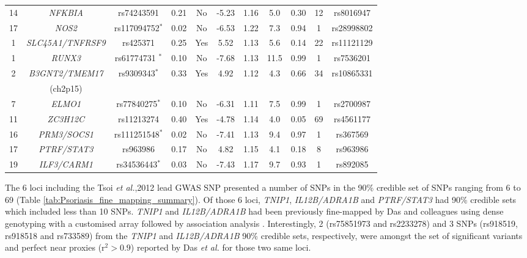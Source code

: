 \begin{landscape}
\begin{center}
\begin{longtable}[ht]{c c c c c c c c c c c}
14	& \textit{NFKBIA}&		 rs74243591            &		0.21 &	No	& -5.23 &1.16 &		5.0  &		0.30 &		12 &		rs8016947 \\
17	& \textit{NOS2}&		   rs117094752$^{\ast}$  &		0.02 &	No  & -6.53 &1.22 &		7.3  &		0.94 &		1  &		rs28998802 \\
1	& \textit{SLC45A1/TNFRSF9}&		rs425371         &		0.25 &  Yes  & 5.52  &1.13 &		5.6  &		0.14 &		22 &		rs11121129 \\
1	& \textit{RUNX3}&		     rs61774731 $^{\ast}$  &		0.10 &	No	& -7.68 &1.13 &		11.5 &		0.99 &		1  &		rs7536201 \\
2	& \textit{B3GNT2/TMEM17}&		rs9309343$^{\ast}$ &		0.33 &	Yes	& 4.92  &1.12 &		4.3  &		0.66 &		34 &		rs10865331 \\
  &  (ch2p15)             &                      &         &         &         &         &       &                \\
7	& \textit{ELMO1}&		     rs77840275$^{\ast}$   &		0.10 &	No	&-6.31  &1.11 &		7.5  &		0.99 &		1  &		rs2700987 \\
11	& \textit{ZC3H12C}&		 rs11213274            &		0.40 &	Yes	& -4.78 &1.14 &		4.0  &		0.05 &		69 &		rs4561177 \\
16	& \textit{PRM3/SOCS1}& rs111251548$^{\ast}$  &		0.02 &	No	& -7.41 &1.13 &		9.4  &		0.97 &		1  &		rs367569 \\
17	& \textit{PTRF/STAT3}& rs963986              &		0.17 &	No	& 4.82  &1.15 &		4.1  &		0.18 &		8  &		rs963986 \\
19	& \textit{ILF3/CARM1}& rs34536443$^{\ast}$   &		0.03 &	No	& -7.43 &1.17 &		9.7  &		0.93 &		1  &		rs892085 \\
\bottomrule
\end{longtable}
\end{center}
\end{landscape}


The 6 loci including the Tsoi \textit{et al.},2012 lead GWAS SNP presented a number of SNPs in the 90\% credible set of SNPs ranging from 6 to 69 (Table \ref{tab:Psoriasis_fine_mapping_summary}). Of those 6 loci, \textit{TNIP1}, \textit{IL12B/ADRA1B} and \textit{PTRF/STAT3} had 90\% credible sets which included less than 10 SNPs. \textit{TNIP1} and \textit{IL12B/ADRA1B} had been previously fine-mapped by Das and colleagues using dense genotyping with a customised array followed by association analysis \parencite{Das2014}. Interestingly, 2 (rs75851973 and rs2233278) and 3 SNPs (rs918519, rs918518 and rs733589) from the \textit{TNIP1} and \textit{IL12B/ADRA1B} 90\% credible sets, respectively, were amongst the set of significant variants and perfect near proxies (r$^2>0.9$) reported  by Das \textit{et al.} for those two same loci.



